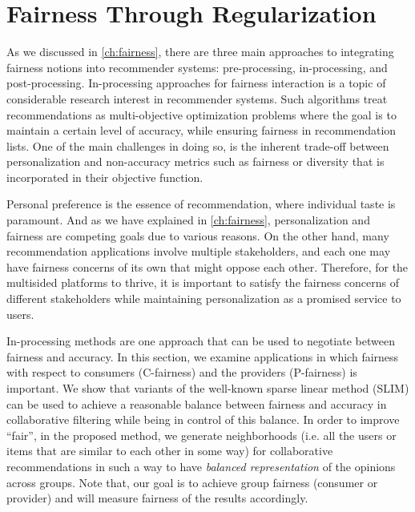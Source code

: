 \chapter{Fairness Through Regularization}
\label{ch:fairness_inproc}


As we discussed in \ref{ch:fairness}, there are three main approaches to integrating fairness notions into recommender systems: pre-processing, in-processing, and post-processing. In-processing approaches for fairness interaction is a topic of considerable research interest in recommender systems. Such algorithms treat recommendations as multi-objective optimization problems where the goal is to maintain a certain level of accuracy, while ensuring fairness in recommendation lists. One of the main challenges in doing so, is the inherent trade-off between personalization and non-accuracy metrics such as fairness or diversity that is incorporated in their objective function.

Personal preference is the essence of recommendation, where individual taste is paramount. And as we have explained in \ref{ch:fairness}, personalization and fairness are competing goals due to various reasons. On the other hand, many recommendation applications involve multiple stakeholders, and each one may have fairness concerns of its own that might oppose each other. Therefore, for the multisided platforms to thrive, it is important to satisfy the fairness concerns of different stakeholders while maintaining personalization as a promised service to users.

In-processing methods are one approach that can be used to negotiate between fairness and accuracy. In this section, we examine applications in which fairness with respect to consumers (C-fairness) and the providers (P-fairness) is important. We show that variants of the well-known sparse linear method (SLIM) can be used to achieve a reasonable balance between fairness and accuracy in collaborative filtering while being in control of this balance. In order to improve ``fair'', in the proposed method, we generate neighborhoods (i.e. all the users or items that are similar to each other in some way) for collaborative recommendations in such a way to have \textit{balanced representation} of the opinions across groups. Note that, our goal is to achieve group fairness (consumer or provider) and will measure fairness of the results accordingly.

